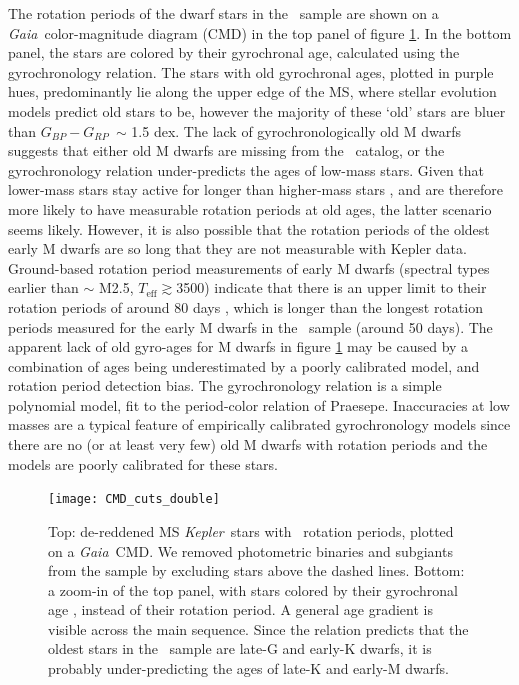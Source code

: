 \documentclass{aastex63}
\newcommand{\eg}{{\it e.g.}}
\newcommand{\kepler}{{\it Kepler}}
\newcommand{\gaia}{{\it Gaia}}
\newcommand{\teff}{$T_{\mathrm{eff}}$}
\newcommand{\gcolor}{$G_{BP} - G_{RP}$}
\newcommand{\mct}{\citet{mcquillan2014}}
\newcommand{\racomment}[1]{{\color{blue}#1}}
\begin{document}
The rotation periods of the dwarf stars in the \mct\ sample are shown on a
\gaia\ color-magnitude diagram (CMD) in the top panel of figure
\ref{fig:age_gradient}.
In the bottom panel, the stars are colored by their gyrochronal age,
calculated using the \citet{angus2019} gyrochronology relation.
The stars with old gyrochronal ages, plotted in purple hues, predominantly lie
along the upper edge of the MS, where stellar evolution models predict old
stars to be, however the majority of these `old' stars are bluer than \gcolor\
$\sim$ 1.5 dex.
The lack of gyrochronologically old M dwarfs suggests that either old M dwarfs
are missing from the \mct\ catalog, or the \citet{angus2019} gyrochronology
relation under-predicts the ages of low-mass stars.
Given that lower-mass stars stay active for longer than higher-mass stars
\citep[\eg][]{west2008, newton2017, kiman2019}, and are therefore more likely
to have measurable rotation periods at old ages, the latter scenario seems
likely.
However, it is also possible that the rotation periods of the oldest early M
dwarfs are so long that they are not measurable with Kepler data.
\racomment{Ground-based rotation period measurements of early M dwarfs
(spectral types earlier than $\sim$ M2.5, \teff $\gtrsim$3500) indicate that
there is an upper limit to their rotation periods of around 80 days
\citep{newton2016, newton2018}, which is longer than the longest rotation
periods measured for the early M dwarfs in the \mct\ sample (around 50 days).}
The apparent lack of old gyro-ages for M dwarfs in figure
\ref{fig:age_gradient} may be caused by a combination of ages being
underestimated by a poorly calibrated model, and rotation period detection
bias.
The \citet{angus2019} gyrochronology relation is a simple polynomial model,
fit to the period-color relation of Praesepe.
Inaccuracies at low masses are a typical feature of empirically calibrated
gyrochronology models since there are no (or at least very few) old M dwarfs
with rotation periods and the models are poorly calibrated for these stars.
\begin{figure}
  \caption{
      Top: de-reddened MS \kepler\ stars with \mct\ rotation periods, plotted
    on a \gaia\ CMD.
    We removed photometric binaries and subgiants from the sample by excluding
    stars above the dashed lines.
    Bottom: a zoom-in of the top panel, with stars colored by their
    gyrochronal age \citep{angus2019}, instead of their rotation period.
    A general age gradient is visible across the main sequence.
    Since the \citet{angus2019} relation predicts that the oldest stars in
    the \mct\ sample are late-G and early-K dwarfs, it is probably
    under-predicting the ages of late-K and early-M dwarfs.
}
  \centering
    \texttt{[image: CMD\_cuts\_double]}
\label{fig:age_gradient}
\end{figure}
\end{document}

